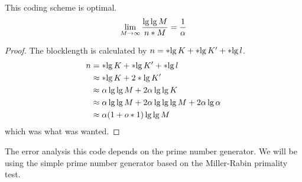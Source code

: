 \begin{theorem}
	This coding scheme is optimal.
	\begin{equation}
		\lim_{M \to \infty} \dfrac{\lg \lg M}{\func{n}{M}} = \dfrac{1}{\alpha}
	\end{equation}
\end{theorem}

\begin{proof}
	The blocklength is calculated by \(n = \ceil{\lg K} + \ceil{\lg K'} + \ceil{\lg l}\).
	\begin{align}
		n &= \ceil{\lg K} + \ceil{\lg K'} + \ceil{\lg l}\\
		&\approx \ceil{\lg K} + 2\ceil{\lg K'} \\
		&\approx \alpha\lg\lg M +  2 \alpha \lg \lg K \\
		&\approx \alpha\lg \lg M + 2\alpha \lg \lg \lg M + 2 \alpha \lg \alpha \\
		&\approx \alpha(1 + \littleO{1}) \lg\lg M
	\end{align}
	which was what was wanted.
\end{proof}
The error analysis this code depends on the prime number generator. We will be using the simple prime number generator  based on the Miller-Rabin primality test.

